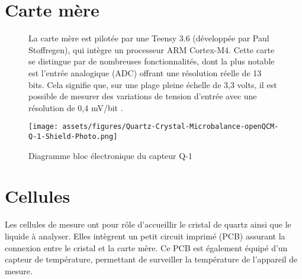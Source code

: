 \section{Carte mère}
\begin{figure}[H]
    \centering
    \begin{minipage}{0.48\textwidth}
        \small
        La carte mère est pilotée par une Teensy 3.6 (développée par Paul Stoffregen), 
        qui intègre un processeur ARM Cortex-M4. Cette carte se distingue par de nombreuses fonctionnalités, 
        dont la plus notable est l'entrée analogique (ADC) offrant une résolution réelle de 13 bits. 
        Cela signifie que, sur une plage pleine échelle de 3,3 volts, il est possible de mesurer des variations de tension d’entrée avec une résolution de 0,4 mV/bit \cite{manual-openqcmQ1}.
    \end{minipage}\hfill
    \begin{minipage}{0.48\textwidth}
        \centering
        \texttt{[image: assets/figures/Quartz-Crystal-Microbalance-openQCM-Q-1-Shield-Photo.png]}
        \caption{Diagramme bloc électronique du capteur Q-1 \cite{manual-openqcmQ1}}
        \label{fig:Main Board Q-1}
    \end{minipage}
\end{figure}

\section{Cellules}
Les cellules de mesure ont pour rôle d’accueillir le cristal de quartz ainsi que le liquide à analyser.
Elles intègrent un petit circuit imprimé (PCB) assurant la connexion entre le cristal et la carte mère.
Ce PCB est également équipé d’un capteur de température, permettant de surveiller la température de l’appareil de mesure.

